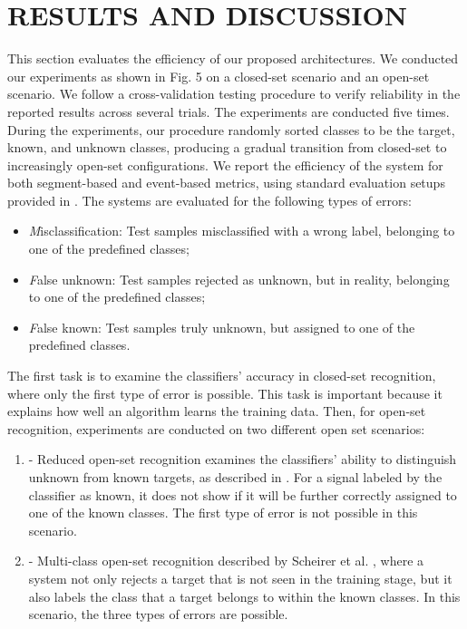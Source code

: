 \documentclass{ieeeaccess}
\begin{document}
\section{RESULTS AND DISCUSSION} \label{sec:VIII}
This section evaluates the efficiency of our proposed architectures. We conducted our experiments as shown in Fig. 5 on a closed-set scenario and an open-set scenario. We follow a cross-validation testing procedure to verify reliability in the reported results across several trials. The experiments are conducted five times. During the experiments, our procedure randomly sorted classes to be the target, known, and unknown classes, producing a gradual transition from closed-set to increasingly open-set configurations. We report the efficiency of the system for both segment-based and event-based metrics, using standard evaluation setups provided in \cite{3}. The systems are evaluated for the following types of errors:
\begin{itemize}	
	\item \emph Misclassification: Test samples misclassified with a wrong label, belonging to one of the predefined classes;
	\item \emph False unknown: Test samples rejected as unknown, but in reality, belonging to one of the predefined classes;  
	\item \emph False known: Test samples truly unknown, but assigned to one of the predefined classes.
\end{itemize}
The first task is to examine the classifiers' accuracy in closed-set recognition, where only the first type of error is possible. This task is important because it explains how well an algorithm learns the training data. Then, for open-set recognition, experiments are conducted on two different open set scenarios:  
\begin{enumerate}
	\item -	Reduced open-set recognition examines the classifiers' ability to distinguish unknown from known targets, as described in \cite{38}. For a signal labeled by the classifier as known, it does not show if it will be further correctly assigned to one of the known classes. The first type of error is not possible in this scenario.
	\item -	Multi-class open-set recognition described by Scheirer et al. \cite{2}, where a system not only rejects a target that is not seen in the training stage, but it also labels the class that a target belongs to within the known classes. In this scenario, the three types of errors are possible.
\end{enumerate}	
\end{document}
